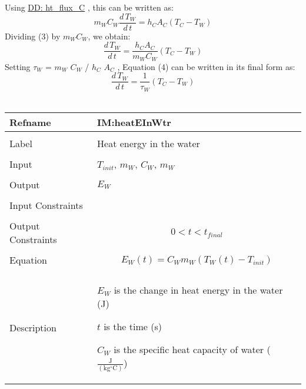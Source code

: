 \documentclass[12pt]{article}
\begin{document}
Using \hyperref[DD:ht.flux.C]{DD: ht\_flux\_C} , this can be written as:
\begin{dmath}
{m_{W}} {C_{W}} \frac{d\,{T_{W}}}{d\,t}={h_{C}} {A_{C}} \left({T_{C}}-{T_{W}}\right)
\end{dmath}
Dividing (3) by ${m_{W}} {C_{W}}$, we obtain:
\begin{dmath}
\frac{d\,{T_{W}}}{d\,t}=\frac{{h_{C}} {A_{C}}}{{m_{W}} {C_{W}}} \left({T_{C}}-{T_{W}}\right)
\end{dmath}
Setting ${τ_{W}}$ = ${m_{W}}$ ${C_{W}}$ / ${h_{C}}$ ${A_{C}}$ , Equation (4) can be written in its final form as:
\begin{dmath}
\frac{d\,{T_{W}}}{d\,t}=\frac{1}{{τ_{W}}} \left({T_{C}}-{T_{W}}\right)
\end{dmath}
~\newline
\noindent \begin{minipage}{\textwidth}
\begin{tabular}{p{} p{}}
\toprule \textbf{Refname} & \textbf{IM:heatEInWtr}
\label{IM:heatEInWtr}
\\ \midrule \\
Label & Heat energy in the water
\\ \midrule \\
Input & ${T_{init}}$, ${m_{W}}$, ${C_{W}}$, ${m_{W}}$
\\ \midrule \\
Output & ${E_{W}}$
\\ \midrule \\
Input Constraints & 
\\ \midrule \\
Output Constraints & \begin{dmath}
                     0<t<{t_{final}}
                     \end{dmath}
\\ \midrule \\
Equation & \begin{dmath}
           {E_{W}}\left(t\right)={C_{W}} {m_{W}} \left({T_{W}}\left(t\right)-{T_{init}}\right)
           \end{dmath}
\\ \midrule \\
Description & \begin{symbDescription}
              \item{${E_{W}}$ is the change in heat energy in the water (J)}
              \item{$t$ is the time (s)}
              \item{${C_{W}}$ is the specific heat capacity of water ($\frac{\text{J}}{(\text{kg}{}^{\circ}\text{C})}$)}

\end{symbDescription}
\end{tabular}
\end{minipage}
\end{document}
